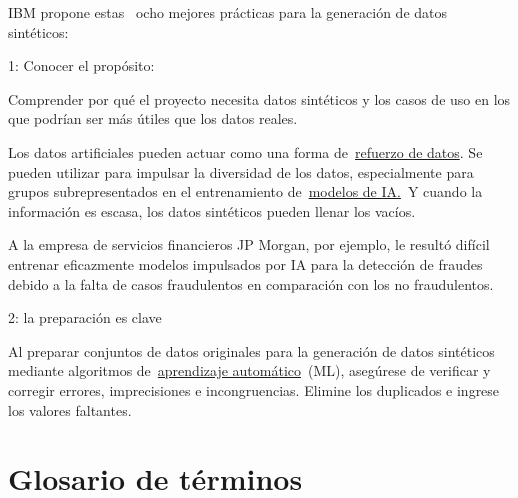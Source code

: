 \documentclass{article}
\begin{document}
IBM propone estas ~ocho mejores pr{\'{a}}cticas para la generaci{\'{o}}n de datos sint{\'{e}}ticos:

1: Conocer el prop{\'{o}}sito:

Comprender por qu{\'{e}} el proyecto necesita datos sint{\'{e}}ticos y los casos de uso en los que podr{\'{i}}an ser m{\'{a}}s {{\'{u}}}tiles que los datos reales.~

Los datos artificiales pueden actuar como una forma de~\href{https://www.ibm.com/mx-es/think/topics/data-augmentation}{refuerzo de datos}. Se pueden utilizar para impulsar la diversidad de los datos, especialmente para grupos subrepresentados en el entrenamiento de~\href{https://www.ibm.com/mx-es/topics/ai-model}{modelos de IA.}~Y cuando la informaci{\'{o}}n es escasa, los datos sint{\'{e}}ticos pueden llenar los vac{\'{i}}os.

A la empresa de servicios financieros JP Morgan, por ejemplo, le result{\'{o}} dif{\'{i}}cil entrenar eficazmente modelos impulsados por IA para la detecci{\'{o}}n de fraudes debido a la falta de casos fraudulentos en comparaci{\'{o}}n con los no fraudulentos.

2: la preparaci{\'{o}}n es clave

Al preparar conjuntos de datos originales para la generaci{\'{o}}n de datos sint{\'{e}}ticos mediante algoritmos de~\href{https://www.ibm.com/mx-es/think/topics/machine-learning}{aprendizaje autom{\'{a}}tico}~(ML), aseg{{\'{u}}}rese de verificar y corregir errores, imprecisiones e incongruencias. Elimine los duplicados e ingrese los valores faltantes.

\section{Glosario de términos}


\end{document}
